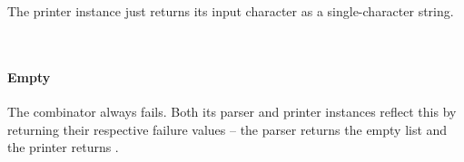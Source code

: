 \documentclass[12pt,a4paper,twoside,openright]{report}
\newcommand{\C}{\AgdaInductiveConstructor}
\newcommand{\F}{\AgdaFunction}
\begin{document}
\begin{code}
\> \AgdaSymbol{:}    \AgdaSymbol{(}  \AgdaSymbol{)}\<%
\\
\> \AgdaInductiveConstructor{[]} \AgdaSymbol{=} \AgdaInductiveConstructor{[]}\<%
\\
\> \AgdaSymbol{(}  \AgdaSymbol{)} \AgdaSymbol{=} \AgdaFunction{[}  \AgdaInductiveConstructor{,}  \AgdaFunction{]}\<%
\\
%
\\
\> \AgdaSymbol{:}  \<%
\\
\> \AgdaSymbol{=}  \<%
\end{code}

The printer instance just returns its input character as a single-character string.

\begin{code}
\> \AgdaSymbol{:}  \<%
\\
\> \AgdaSymbol{=}      \AgdaFunction{[}  \AgdaFunction{]}\AgdaSymbol{)}\<%
\end{code}

\paragraph{Empty} The \F{empty} combinator always fails. Both its parser and printer instances reflect this by returning their respective failure values -- the parser returns the empty list and the printer returns \C{nothing}.

\begin{code}
\>[0] \AgdaSymbol{:} \AgdaSymbol{\{} \AgdaSymbol{:} \AgdaSymbol{\}}   \<%
\\
\>[4] \AgdaSymbol{=}     \AgdaInductiveConstructor{[]}\AgdaSymbol{)}\<%
\end{code}
\end{document}

